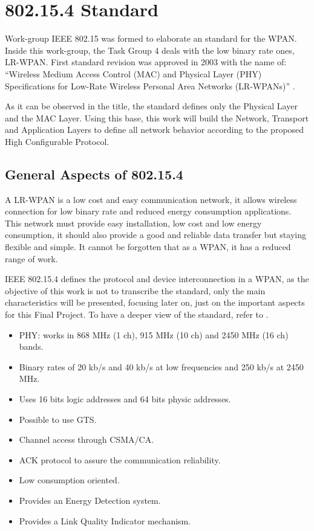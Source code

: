 \chapter{802.15.4 Standard}

Work-group \ac{IEEE} 802.15 was formed to elaborate an standard for the \ac{WPAN}. Inside this work-group, the Task Group 4 
deals with the low binary rate ones, \ac{LR-WPAN}. First standard revision was approved in 2003 with the name of: ``Wireless 
Medium Access Control (MAC) and Physical Layer (PHY) Specifications for Low-Rate Wireless Personal Area Networks (LR-WPANs)'' 
\cite{IEEE802.15.4-2003}.

As it can be observed in the title, the standard defines only the Physical Layer and the \ac{MAC} Layer. Using this base, 
this work will build the Network, Transport and Application Layers to define all network behavior according to the proposed 
High Configurable Protocol.

\section{General Aspects of 802.15.4}

A \ac{LR-WPAN} is a low cost and easy communication network, it allows wireless connection for low binary rate and reduced 
energy consumption applications. This network must provide easy installation, low cost and low energy consumption, it should
also provide a good and reliable data transfer but staying flexible and simple. It cannot be forgotten that as a \ac{WPAN}, it
has a reduced range of work.

\ac{IEEE} 802.15.4 defines the protocol and device interconnection in a \ac{WPAN}, as the objective of this work is not to 
transcribe the standard, only the main characteristics will be presented, focusing later on, just on the important aspects
for this Final Project. To have a deeper view of the standard, refer to \cite{IEEE802.15.4-2003}.

\begin{itemize}
 \item \ac{PHY}: works in 868 MHz (1 ch), 915 MHz (10 ch) and 2450 MHz (16 ch) bands.
 \item Binary rates of 20 kb/s and 40 kb/s at low frequencies and 250 kb/s at 2450 MHz.
 \item Uses 16 bits logic addresses and 64 bits physic addresses.
 \item Possible to use \ac{GTS}.
 \item Channel access through \ac{CSMA/CA}.
 \item \ac{ACK} protocol to assure the communication reliability.
 \item Low consumption oriented.
 \item Provides an Energy Detection system.
 \item Provides a Link Quality Indicator mechanism.
\end{itemize}


